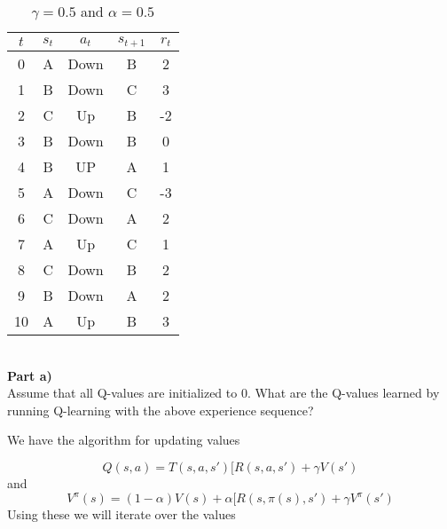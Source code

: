 \documentclass[12pt,letter]{article}
\newcommand{\ppart}[1]{\vspace{2mm}\large\textbf{\\Part {#1})\vspace{2mm}}\normalsize\\}
\begin{document}
\begin{table}[h]
\centering
\begin{tabular}{|c|c|c|c|c|}
    \hline
    $t$ & $s_t$ & $a_t$ & $s_{t+1}$ & $r_t$\\
    \hline
    0 & A & Down & B & 2\\\hline
    1 & B & Down & C & 3\\\hline
    2 & C & Up   & B & -2\\\hline
    3 & B & Down & B & 0\\\hline
    4 & B & UP   & A & 1\\\hline
    5 & A & Down & C & -3\\\hline
    6 & C & Down & A & 2\\\hline
    7 & A & Up   & C & 1\\\hline
    8 & C & Down & B & 2\\\hline
    9 & B & Down & A & 2\\\hline
    10& A & Up   & B & 3\\\hline
\end{tabular}
\caption{$\gamma = 0.5$ and $\alpha = 0.5$}
\end{table}
\ppart{a}
Assume that all Q-values are initialized to 0. What are the Q-values learned by
running Q-learning with the above experience sequence?

We have the algorithm for updating values

\[
    Q(s,a) = T(s,a,s')[R(s,a,s') + \gamma V(s')
\]
and
\[
    V^\pi(s) = (1-\alpha)V(s) + \alpha[R(s,\pi(s),s') + \gamma V^\pi(s')
\]
Using these we will iterate over the values
\end{document}
